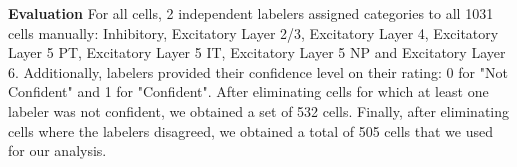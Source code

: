 \documentclass[runningheads]{llncs}
\begin{document}
\noindent \textbf{Evaluation}
For all cells, 2 independent labelers assigned categories to all 1031 cells manually: Inhibitory, Excitatory Layer 2/3, Excitatory Layer 4, Excitatory Layer 5 PT, Excitatory Layer 5 IT, Excitatory Layer 5 NP and Excitatory Layer 6. Additionally, labelers provided their confidence level on their rating: 0 for "Not Confident" and 1 for "Confident". After eliminating cells for which at least one labeler was not confident, we obtained a set of 532 cells. 
Finally, after eliminating cells where the labelers disagreed, we obtained a total of 505 cells that we used for our analysis.
\end{document}
